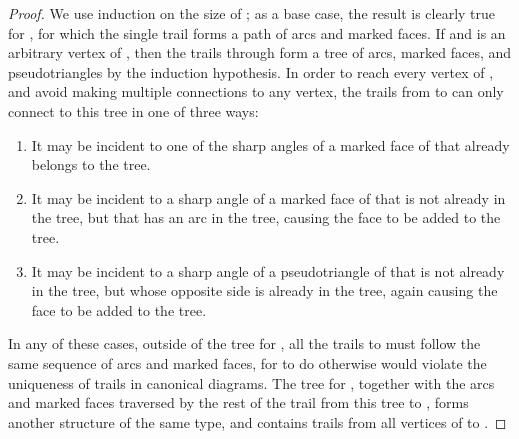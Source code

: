 \documentclass{llncs}
\begin{document}
\begin{proof}
We use induction on the size of ; as a base case, the result is clearly true for , for which the single trail forms a path of arcs and marked faces. If  and  is an arbitrary vertex of , then the trails through  form a tree of arcs, marked faces, and pseudotriangles by the induction hypothesis.
In order to reach every vertex of , and avoid making multiple connections to any vertex, the trails from  to  can only connect to this tree in one of three ways:
\begin{enumerate}
\item It may be incident to one of the sharp angles of a marked face of  that already belongs to  the tree.
\item It may be incident to a sharp angle of a marked face of  that is not already in the tree, but that has an arc in the tree, causing the face to be added to the tree.
\item It may be incident to a sharp angle of a pseudotriangle of  that is not already in the tree, but whose opposite side is already in the tree, again causing the face to be added to the tree.
\end{enumerate}
In any of these cases, outside of the tree for , all the trails to  must follow the same sequence of arcs and marked faces, for to do otherwise would violate the uniqueness of trails in canonical diagrams. The tree for , together with the arcs and marked faces traversed by the rest of the trail from this tree to , forms another structure of the same type, and contains trails from all vertices of  to .
\end{proof}
\end{document}
